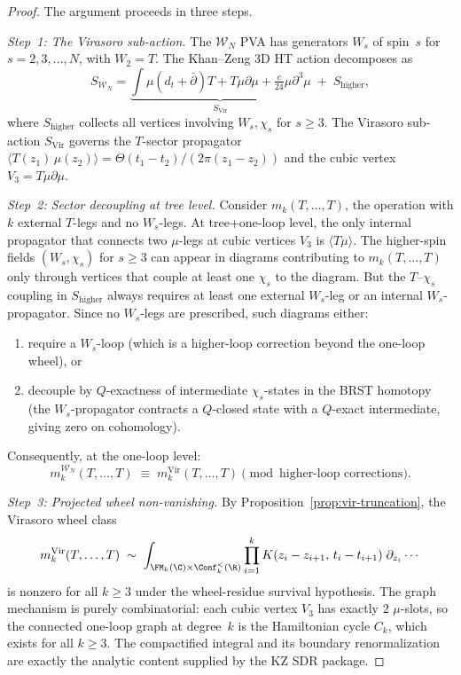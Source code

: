 \begin{proof}
The argument proceeds in three steps.

\medskip
\emph{Step~1: The Virasoro sub-action.}
The $\mathcal{W}_N$ PVA has generators $W_s$ of spin~$s$ for
$s = 2, 3, \ldots, N$, with $W_2 = T$. The Khan--Zeng 3D HT action
decomposes as
\[
S_{\mathcal{W}_N}
= \underbrace{\int \mu(d_t + \bar\partial)T + T\mu\partial\mu
 + \tfrac{c}{24}\mu\partial^3\mu}_{S_{\mathrm{Vir}}}
\;+\; S_{\mathrm{higher}},
\]
where $S_{\mathrm{higher}}$ collects all vertices involving
$W_s, \chi_s$ for $s \ge 3$. The Virasoro sub-action
$S_{\mathrm{Vir}}$ governs the $T$-sector propagator
$\langle T(z_1)\,\mu(z_2) \rangle = \Theta(t_1-t_2)/(2\pi(z_1-z_2))$
and the cubic vertex $V_3 = T\mu\partial\mu$.

\medskip
\emph{Step~2: Sector decoupling at tree level.}
Consider $m_k(T, \ldots, T)$, the operation with $k$ external
$T$-legs and no $W_s$-legs. At tree+one-loop level, the only
internal propagator that connects two $\mu$-legs at cubic
vertices $V_3$ is $\langle T\mu \rangle$. The higher-spin fields
$(W_s, \chi_s)$ for $s \ge 3$ can appear in diagrams contributing
to $m_k(T, \ldots, T)$ only through vertices that couple at least
one $\chi_s$ to the diagram. But the $T$--$\chi_s$ coupling in
$S_{\mathrm{higher}}$ always requires at least one external
$W_s$-leg or an internal $W_s$-propagator. Since no $W_s$-legs
are prescribed, such diagrams either:
\begin{enumerate}[label=(\alph*)]
\item require a $W_s$-loop (which is a higher-loop correction
 beyond the one-loop wheel), or
\item decouple by $Q$-exactness of intermediate $\chi_s$-states
 in the BRST homotopy (the $W_s$-propagator contracts a
 $Q$-closed state with a $Q$-exact intermediate, giving zero
 on cohomology).
\end{enumerate}
Consequently, at the one-loop level:
\begin{equation}
\label{eq:wn-sector-decoupling}
m_k^{\mathcal{W}_N}(T, \ldots, T)
\;\equiv\; m_k^{\mathrm{Vir}}(T, \ldots, T)
\pmod{\text{higher-loop corrections}}.
\end{equation}

\medskip
\emph{Step~3: Projected wheel non-vanishing.}
By Proposition~\ref{prop:vir-truncation}, the Virasoro wheel class
\[
m_k^{\mathrm{Vir}}(T, \ldots, T)
\;\sim\; \int_{\FM_k(\C) \times \Conf_k^{<}(\R)}
 \prod_{i=1}^k K(z_i - z_{i+1},\, t_i - t_{i+1})\;
 \partial_{z_i}\cdots
\]
is nonzero for all $k \ge 3$ under the wheel-residue survival
hypothesis. The graph mechanism is purely combinatorial: each cubic
vertex $V_3$ has exactly $2$ $\mu$-slots, so the connected one-loop
graph at degree~$k$ is the Hamiltonian cycle $C_k$, which exists for
all $k \ge 3$. The compactified integral and its boundary
renormalization are exactly the analytic content supplied by the KZ SDR
package.


\end{proof}
